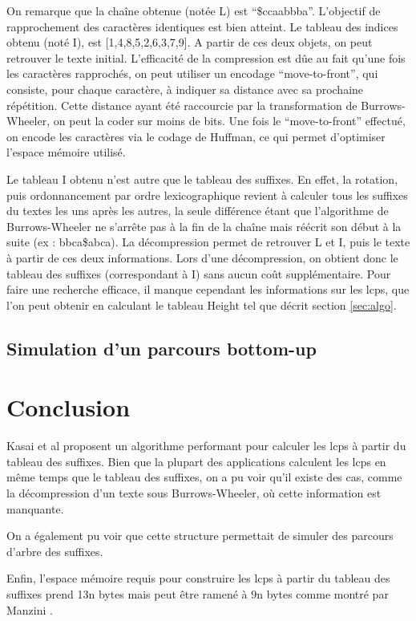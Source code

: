 \documentclass[a4paper,10pt]{article}
\begin{document}
On remarque que la chaîne obtenue (notée L) est
``\$ccaabbba''. L'objectif de rapprochement des caractères identiques
est bien atteint. Le tableau des indices obtenu (noté I), est
[1,4,8,5,2,6,3,7,9]. A partir de ces deux objets, on peut retrouver le
texte initial. L'efficacité de la compression est dûe au fait qu'une
fois les caractères rapprochés, on peut utiliser un encodage
``move-to-front'', qui consiste, pour chaque caractère, à indiquer sa
distance avec sa prochaine répétition. Cette distance ayant été
raccourcie par la transformation de Burrows-Wheeler, on peut la coder
sur moins de bits. Une fois le ``move-to-front'' effectué, on encode
les caractères via le codage de Huffman, ce qui permet d'optimiser
l'espace mémoire utilisé.

Le tableau I obtenu n'est autre que le tableau des suffixes. En effet,
la rotation, puis ordonnancement par ordre lexicographique revient à
calculer tous les suffixes du textes les uns après les autres, la
seule différence étant que l'algorithme de Burrows-Wheeler ne s'arrête
pas à la fin de la chaîne mais réécrit son début à la suite (ex :
bbca\$abca). La décompression permet de retrouver L et I, puis le
texte à partir de ces deux informations. Lors d'une décompression, on
obtient donc le tableau des suffixes (correspondant à I) sans aucun
coût supplémentaire. Pour faire une recherche efficace, il manque
cependant les informations sur les lcps, que l'on peut obtenir en
calculant le tableau Height tel que décrit section \ref{sec:algo}.


\subsection{Simulation d'un parcours bottom-up}
\label{sec:bottomup}


\section{Conclusion}
\label{sec:conclusion}


Kasai et al proposent un algorithme performant pour calculer les lcps
à partir du tableau des suffixes. Bien que la plupart des applications
calculent les lcps en même temps que le tableau des suffixes, on a pu
voir qu'il existe des cas, comme la décompression d'un texte sous
Burrows-Wheeler, où cette information est manquante.

On a également pu voir que cette structure permettait de simuler des
parcours d'arbre des suffixes.

Enfin, l'espace mémoire requis pour construire les lcps à partir du
tableau des suffixes prend 13n bytes mais peut être ramené à 9n bytes
comme montré par Manzini \cite{Manzini04}.




\end{document}
